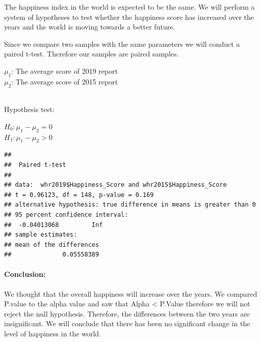 \documentclass[
]{article}
\newenvironment{Shaded}{\begin{snugshade}}{\end{snugshade}}
\newcommand{\AttributeTok}[1]{\textcolor[rgb]{0.77,0.63,0.00}{#1}}
\newcommand{\ConstantTok}[1]{\textcolor[rgb]{0.00,0.00,0.00}{#1}}
\newcommand{\FunctionTok}[1]{\textcolor[rgb]{0.00,0.00,0.00}{#1}}
\newcommand{\NormalTok}[1]{#1}
\newcommand{\SpecialCharTok}[1]{\textcolor[rgb]{0.00,0.00,0.00}{#1}}
\newcommand{\StringTok}[1]{\textcolor[rgb]{0.31,0.60,0.02}{#1}}
\begin{document}
The happiness index in the world is expected to be the same. We will
perform a system of hypotheses to test whether the happiness score has
increased over the years and the world is moving towards a better
future.

Since we compare two samples with the same parameters we will conduct a
paired t-test. Therefore our samples are paired samples.

\(\mu_{1}\): The average score of 2019 report\\
\(\mu_{2}\): The average score of 2015 report\\
\strut \\

Hypothesis test:

\(H_{0}: \mu_{1}-\mu_{2} = 0\)\\
\(H_{1}: \mu_{1}-\mu_{2} > 0\)\\

\begin{Shaded}
\end{Shaded}

\begin{verbatim}
## 
##  Paired t-test
## 
## data:  whr2019$Happiness_Score and whr2015$Happiness_Score
## t = 0.96123, df = 148, p-value = 0.169
## alternative hypothesis: true difference in means is greater than 0
## 95 percent confidence interval:
##  -0.04013068         Inf
## sample estimates:
## mean of the differences 
##              0.05558389
\end{verbatim}

\hypertarget{conclusion}{%
\paragraph{Conclusion:}\label{conclusion}}

We thought that the overall happiness will increase over the years. We
compared P.value to the alpha value and saw that Alpha \textless{}
P.Value therefore we will not reject the null hypothesis. Therefore, the
differences between the two years are insignificant. We will conclude
that there has been no significant change in the level of happiness in
the world.
\end{document}
